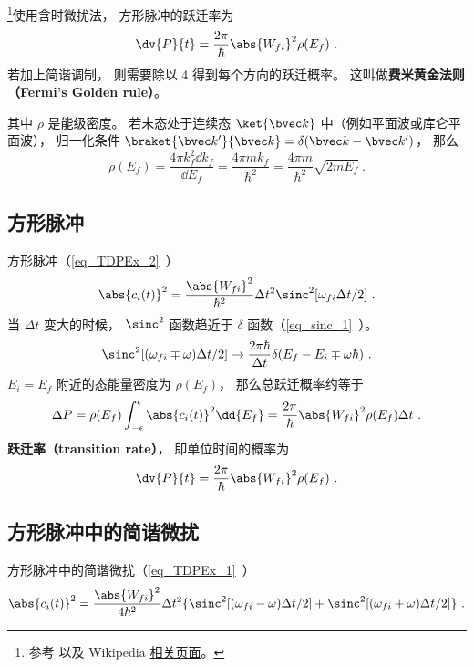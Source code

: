 

\footnote{参考 \cite{Bransden} 以及 Wikipedia \href{https://en.wikipedia.org/wiki/Fermi's_golden_rule}{相关页面}。}使用含时微扰法， 方形脉冲的跃迁率为
\begin{equation} %
\dv{P}{t} = \frac{2\pi}{\hbar} \abs{W_{fi}}^2\rho(E_f)~.
\end{equation}
若加上简谐调制， 则需要除以 4 得到每个方向的跃迁概率。 这叫做\textbf{费米黄金法则（Fermi's Golden rule）}。

其中 $\rho$ 是能级密度。 若末态处于连续态 $\ket{\bvec k}$ 中（例如平面波或库仑平面波）， 归一化条件 $\braket{\bvec k'}{\bvec k} = \delta(\bvec k - \bvec k')$， 那么
\begin{equation}
\rho(E_f) = \frac{4\pi k_f^2\dd{k_f}}{\dd{E_f}} = \frac{4\pi m k_f}{\hbar^2} = \frac{4\pi m}{\hbar^2}\sqrt{2mE_f}~.
\end{equation}

\subsection{方形脉冲}
方形脉冲（\autoref{eq_TDPEx_2}~）
\begin{equation}
\abs{c_i(t)}^2 = \frac{\abs{W_{fi}}^2}{\hbar^2} \Delta t^2 \sinc^2[\omega_{fi}\Delta t/2]~.
\end{equation}
当 $\Delta t$ 变大的时候， $\sinc^2$ 函数趋近于 $\delta$ 函数（\autoref{eq_sinc_1}~）。
\begin{equation}
\sinc^2[(\omega_{fi}\mp\omega)\Delta t/2] \to \frac{2\pi\hbar}{\Delta t}\delta(E_f - E_i \mp \omega\hbar)~.
\end{equation}
$E_i=E_f$ 附近的态能量密度为 $\rho(E_f)$， 那么总跃迁概率约等于
\begin{equation}
\Delta P = \rho(E_f)\int_{-\epsilon}^{\epsilon}\abs{c_i(t)}^2 \dd{E_f}
= \frac{2\pi}{\hbar} \abs{W_{fi}}^2\rho(E_f)\Delta t~.
\end{equation}
\textbf{跃迁率（transition rate）}， 即单位时间的概率为
\begin{equation}
\dv{P}{t} = \frac{2\pi}{\hbar} \abs{W_{fi}}^2\rho(E_f)~.
\end{equation}

\subsection{方形脉冲中的简谐微扰}
方形脉冲中的简谐微扰（\autoref{eq_TDPEx_1}~）
\begin{equation}
\abs{c_i(t)}^2 = \frac{\abs{W_{fi}}^2}{4\hbar^2} \Delta t^2 \{\sinc^2[(\omega_{fi}-\omega)\Delta t/2] + \sinc^2[(\omega_{fi}+\omega)\Delta t/2]\}~.
\end{equation}

